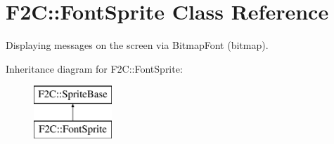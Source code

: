 \hypertarget{class_f2_c_1_1_font_sprite}{
\section{F2C::FontSprite Class Reference}
\label{class_f2_c_1_1_font_sprite}
}


Displaying messages on the screen via BitmapFont (bitmap).  


Inheritance diagram for F2C::FontSprite:\begin{figure}[H]
\begin{center}
\leavevmode
\includegraphics[height=2.000000cm]{class_f2_c_1_1_font_sprite}
\end{center}
\end{figure}
